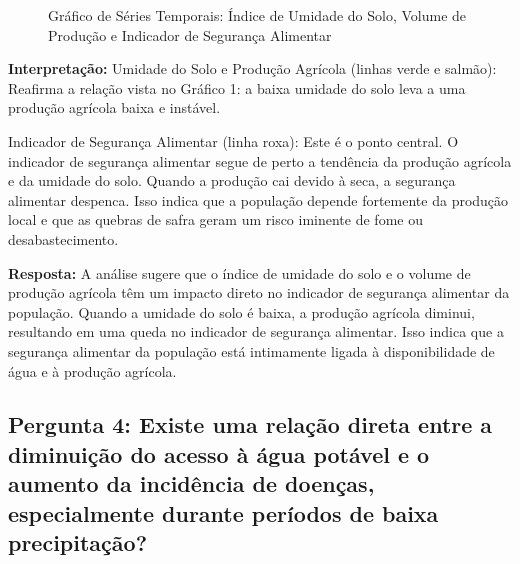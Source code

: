 \documentclass[12pt, a4paper, onecolumn]{article}
\begin{document}
    \begin{figure}[htbp]
        \centering
        \caption{Gráfico de Séries Temporais: Índice de Umidade do Solo, Volume de Produção e Indicador de Segurança Alimentar}
        \label{fig:serie_temporal_umidade_producao_seguranca}
    \end{figure}

    \textbf{Interpretação:} Umidade do Solo e Produção Agrícola (linhas verde e salmão): Reafirma a relação vista no Gráfico 1: a baixa umidade do solo leva a uma produção agrícola baixa e instável.

    Indicador de Segurança Alimentar (linha roxa): Este é o ponto central. O indicador de segurança alimentar segue de perto a tendência da produção agrícola e da umidade do solo. Quando a produção cai devido à seca, a segurança alimentar despenca. Isso indica que a população depende fortemente da produção local e que as quebras de safra geram um risco iminente de fome ou desabastecimento.
    \vspace{0.5cm}

    \textbf{Resposta:} A análise sugere que o índice de umidade do solo e o volume de produção agrícola têm um impacto direto no indicador de segurança alimentar da população. Quando a umidade do solo é baixa, a produção agrícola diminui, resultando em uma queda no indicador de segurança alimentar. Isso indica que a segurança alimentar da população está intimamente ligada à disponibilidade de água e à produção agrícola.

    \subsection*{Pergunta 4: Existe uma relação direta entre a diminuição do acesso à água potável e o aumento da incidência de doenças, especialmente durante períodos de baixa precipitação?}
\end{document}

